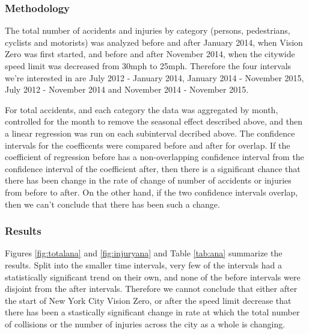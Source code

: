 \documentclass[10pt,journal,compsoc]{IEEEtran}
\begin{document}
\subsubsection{Methodology}

The total number of accidents and injuries by category (persons, pedestrians, cyclists and motorists) was analyzed before and after January 2014, when Vision Zero was first started, and before and after November 2014, when the citywide speed limit was decreased from 30mph to 25mph.  Therefore the four intervals we're interested in are July 2012 - January 2014, January 2014 - November 2015, July 2012 - November 2014 and November 2014 - November 2015.

For total accidents, and each category the data was aggregated by month, controlled for the month to remove the seasonal effect described above, and then a linear regression was run on each subinterval decribed above.  The confidence intervals for the coefficents were compared before and after for overlap.  If the coefficient of regression before has a non-overlapping confidence interval from the confidence interval of the coefficient after, then there is a significant chance that there has been  change in the rate of change of number of accidents or injuries from before to after.  On the other hand, if the two confidence intervals overlap, then we can't conclude that there has been such a change.

\subsubsection{Results}

Figures \ref{fig:totalana} and \ref{fig:injuryana} and Table \ref{tab:ana} summarize the results.  Split into the smaller time intervals, very few of the intervals had a statistically significant trend on their own, and none of the before intervals were disjoint from the after intervals.  Therefore we cannot conclude that either after the start of New York City Vision Zero, or after the speed limit decrease that there has been a stastically significant change in rate at which the total number of collisions or the number of injuries across the city as a whole is changing.  
\end{document}

